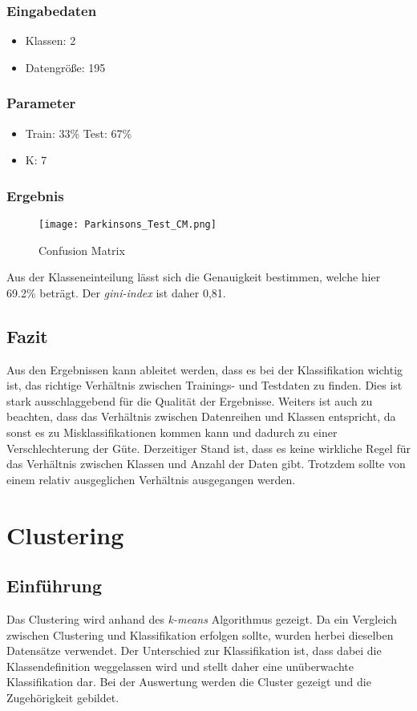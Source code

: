 \subsubsection{Eingabedaten}
\begin{itemize}
	\item Klassen: 2
	\item Datengröße: 195
\end{itemize}
\subsubsection{Parameter}
\begin{itemize}
	\item Train: 33\% Test: 67\%

	\item K: 7
\end{itemize}
\subsubsection{Ergebnis}
\begin{figure}[H]
\texttt{[image: Parkinsons\_Test\_CM.png]}
\caption{Confusion Matrix}
\end{figure}

Aus der Klasseneinteilung lässt sich die Genauigkeit bestimmen, welche hier 69.2\% beträgt. Der \textit{gini-index} ist daher 0,81.
\subsection{Fazit}
Aus den Ergebnissen kann ableitet werden, dass es bei der Klassifikation wichtig ist, das richtige Verhältnis zwischen Trainings- und Testdaten zu finden. Dies ist stark ausschlaggebend für die Qualität der Ergebnisse. Weiters ist auch zu beachten, dass das Verhältnis zwischen Datenreihen und Klassen entspricht, da sonst es zu Misklassifikationen kommen kann und dadurch zu einer Verschlechterung der Güte. Derzeitiger Stand ist, dass es keine wirkliche Regel für das Verhältnis zwischen Klassen und Anzahl der Daten gibt. Trotzdem sollte von einem relativ ausgeglichen Verhältnis ausgegangen werden.
\section{Clustering}
\subsection{Einführung}
Das Clustering wird anhand des \textit{k-means} Algorithmus gezeigt. Da ein Vergleich zwischen Clustering und Klassifikation erfolgen sollte, wurden herbei dieselben Datensätze verwendet. Der Unterschied zur Klassifikation ist, dass dabei die Klassendefinition weggelassen wird und stellt daher eine unüberwachte Klassifikation dar. Bei der Auswertung werden die Cluster gezeigt und die Zugehörigkeit gebildet. \cite{uci}
